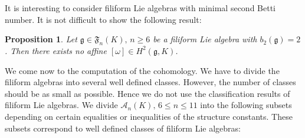 \documentclass[12pt]{amsart}
\newtheorem{prop}[thm]{Proposition}
\theoremstyle{definition}
\theoremstyle{remark}
\newcommand{\Lg}{\mathfrak{g}}
\newcommand{\LF}{\mathfrak{F}}
\newcommand{\CA}{\mathcal{A}}
\newcommand{\om}{\omega}
\begin{document}
It is interesting to consider
filiform Lie algebras with minimal
second Betti number. It is not difficult to show the
following result:

\begin{prop} \label{be2}
Let $\Lg\in\LF_n(K),\, n\ge 6$ be a filiform Lie algebra with $b_2(\Lg)=2$.
Then there exists no affine $[\om]\in H^2(\Lg,K)$.
\end{prop}

We come now to the computation of the cohomology.  
We have to divide the filiform algebras into several well defined classes.
However, the number of classes should be as small as possible.
Hence we do not use the classification results of filiform Lie algebras. 
We divide $\CA_n(K),\,6\le n\le 11$
into the following subsets depending on certain equalities or inequalities
of the structure constants. These subsets correspond to well defined
classes of filiform Lie algebras:
\end{document}
